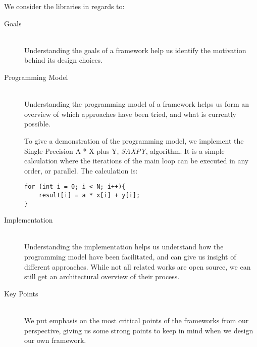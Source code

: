We consider the libraries in regards to:
\begin{description}
\item[Goals] \hfill \\
Understanding the goals of a framework help us identify the motivation behind its design choices.

\item[Programming Model] \hfill \\
Understanding the programming model of a framework helps us form an overview of which approaches have been tried, and what is currently possible. 

To give a demonstration of the programming model, we implement the Single-Precision A * X plus Y, \textit{SAXPY}, algorithm. It is a simple calculation where the iterations of the main loop can be executed in any order, or parallel. The calculation is:
\begin{lstlisting}
for (int i = 0; i < N; i++){
    result[i] = a * x[i] + y[i];
}
\end{lstlisting}

\item[Implementation] \hfill \\
Understanding the implementation helps us understand how the programming model have been facilitated, and can give us insight of different approaches. While not all related works are open source, we can still get an architectural overview of their process.

\item[Key Points] \hfill \\
We put emphasis on the most critical points of the frameworks from our perspective, giving us some strong points to keep in mind when we design our own framework.
\end{description}